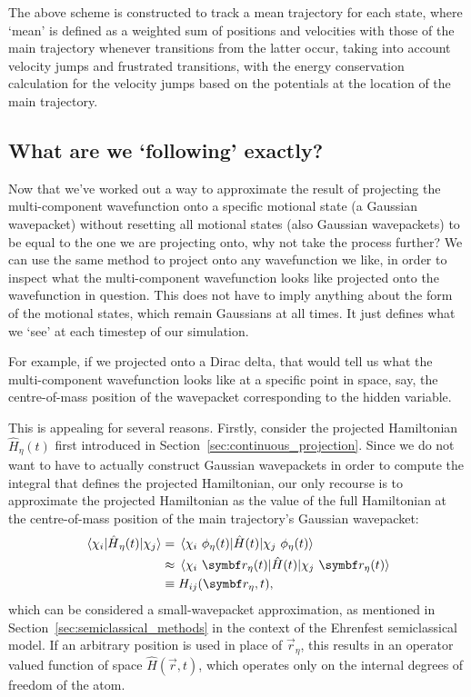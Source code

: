 The above scheme is constructed to track a mean trajectory for each state, where `mean' is defined as a weighted sum of positions and velocities with those of the main trajectory whenever transitions from the latter occur, taking into account velocity jumps and frustrated transitions, with the energy conservation calculation for the velocity jumps based on the potentials at the location of the main trajectory.

\subsection{What are we `following' exactly?}\label{sec:dirac_deltas}

Now that we've worked out a way to approximate the result of projecting the multi-component wavefunction onto a specific motional state (a Gaussian wavepacket) without resetting all motional states (also Gaussian wavepackets) to be equal to the one we are projecting onto, why not take the process further? We can use the same method to project onto any wavefunction we like, in order to inspect what the multi-component wavefunction looks like projected onto the wavefunction in question. This does not have to imply anything about the form of the motional states, which remain Gaussians at all times. It just defines what we `see' at each timestep of our simulation.

For example, if we projected onto a Dirac delta, that would tell us what the multi-component wavefunction looks like at a specific point in space, say, the centre-of-mass position of the wavepacket corresponding to the hidden variable.

This is appealing for several reasons. Firstly, consider the projected Hamiltonian $\hat H_\eta(t)$ first introduced in Section~\ref{sec:continuous_projection}. Since we do not want to have to actually construct Gaussian wavepackets in order to compute the integral that defines the projected Hamiltonian, our only recourse is to approximate the projected Hamiltonian as the value of the full Hamiltonian at the centre-of-mass position of the main trajectory's Gaussian wavepacket:
\begin{align}
\matrixel{\chi_i}{\hat H_{\eta}(t)}{\chi_j} &= \matrixel{\chi_i\ \phi_\eta(t)}{\hat H(t)}{\chi_j\ \phi_\eta(t)}\\
&\approx \matrixel{\chi_i\ \vec r_\eta(t)}{\hat H(t)}{\chi_j\ \vec r_\eta(t)}\\
&\equiv H_{ij}(\vec r_\eta, t),
\end{align}
which can be considered a small-wavepacket approximation, as mentioned in Section~\ref{sec:semiclassical_methods} in the context of the Ehrenfest semiclassical model. If an arbitrary position is used in place of $\vec r_\eta$, this results in an operator valued function of space $\hat H(\vec r, t)$, which operates only on the internal degrees of freedom of the atom.


